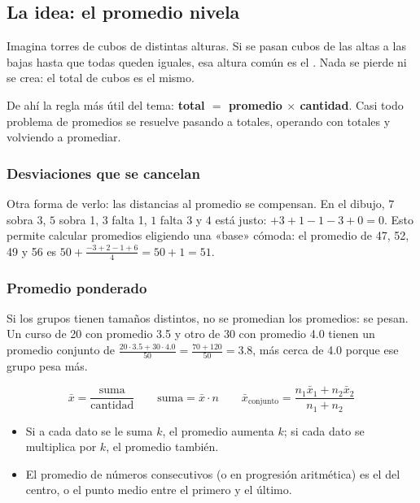 \bitacora


\subsection{La idea: el promedio nivela}
Imagina torres de cubos de distintas alturas. Si se pasan cubos de las altas a las bajas hasta que todas queden iguales,
esa altura común es el . Nada se pierde ni se crea: el total de cubos es el mismo.


De ahí la regla más útil del tema: \textbf{total $=$ promedio $\times$ cantidad}. Casi todo problema de promedios se
resuelve pasando a totales, operando con totales y volviendo a promediar.

\subsubsection{Desviaciones que se cancelan}
Otra forma de verlo: las distancias al promedio se compensan. En el dibujo, $7$ sobra 3, $5$ sobra 1, $3$ falta 1, $1$
falta 3 y $4$ está justo: $+3 + 1 - 1 - 3 + 0 = 0$. Esto permite calcular promedios eligiendo una «base» cómoda:
el promedio de 47, 52, 49 y 56 es $50 + \tfrac{-3 + 2 - 1 + 6}{4} = 50 + 1 = 51$.

\subsubsection{Promedio ponderado}
Si los grupos tienen tamaños distintos, no se promedian los promedios: se pesan. Un curso de 20 con promedio 3.5 y otro
de 30 con promedio 4.0 tienen un promedio conjunto de $\tfrac{20 \cdot 3.5 + 30 \cdot 4.0}{50} = \tfrac{70 + 120}{50}
= 3.8$, más cerca de 4.0 porque ese grupo pesa más.

\begin{regla}
\[\bar x = \frac{\text{suma}}{\text{cantidad}}\qquad\text{suma} = \bar x \cdot n\qquad
\bar x_{\text{conjunto}} = \frac{n_1\bar x_1 + n_2 \bar x_2}{n_1 + n_2}\]
\begin{itemize}
  \item Si a cada dato se le suma $k$, el promedio aumenta $k$; si cada dato se multiplica por $k$, el promedio también.
  \item El promedio de números consecutivos (o en progresión aritmética) es el del centro, o el punto medio entre el
  primero y el último.
\end{itemize}
\end{regla}

